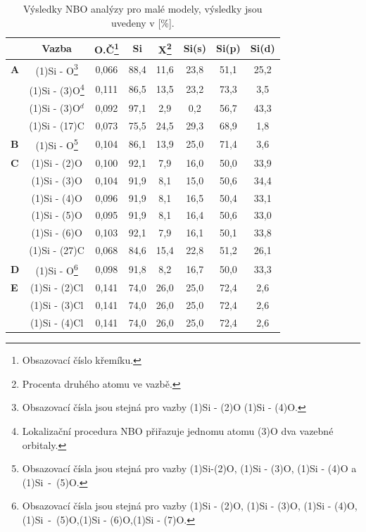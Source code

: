 \documentclass[
digital, %
table,   %
lof,     %
lot,     %
oneside,
]{fithesis3}
\begin{document}
\begin{table}[htbp]
\begin{minipage}{\textwidth}
\caption{Výsledky NBO analýzy pro malé modely, výsledky jsou uvedeny v [\%].}
\begin{center}
\begin{tabular}{|l|c|c|c|c|c|c|c|}
\hline
\label{nbo_small} &  Vazba & O.Č\footnote{Obsazovací číslo křemíku.} & Si & X\footnote{Procenta druhého atomu ve  vazbě.} & Si(s) & Si(p) &Si(d) \\ \hline
\textbf{A} & (1)Si - O\footnote{ Obsazovací čísla jsou stejná pro vazby (1)Si - (2)O (1)Si - (4)O.}  & 0,066 & 88,4  & 11,6  & 23,8  & 51,1  & 25,2  \\ \hline
&  (1)Si - (3)O\footnote{Lokalizační procedura NBO přiřazuje jednomu atomu (3)O dva vazebné orbitaly.} & 0,111 & 86,5  & 13,5  & 23,2  & 73,3  & 3,5  \\ \hline
&  (1)Si - (3)O$^d$ & 0,092 & 97,1  & 2,9  & 0,2  & 56,7  & 43,3  \\ \hline
& (1)Si - (17)C & 0,073 & 75,5  & 24,5  & 29,3  & 68,9  & 1,8  \\ \hline
\textbf{B} & (1)Si - O\footnote{Obsazovací čísla jsou stejná pro vazby (1)Si-(2)O, (1)Si - (3)O, (1)Si - (4)O a (1)Si~-~(5)O.}  & 0,104 & 86,1  & 13,9  & 25,0  & 71,4  & 3,6  \\ \hline
\textbf{C} & (1)Si - (2)O  & 0,100 & 92,1  & 7,9  & 16,0  & 50,0  & 33,9  \\ \hline
& (1)Si - (3)O & 0,104 & 91,9  & 8,1  & 15,0  & 50,6  & 34,4  \\ \hline
&  (1)Si - (4)O& 0,096 & 91,9  & 8,1  & 16,5  & 50,4  & 33,1  \\ \hline
&  (1)Si - (5)O &0,095 & 91,9  & 8,1  & 16,4  & 50,6  & 33,0  \\ \hline
&  (1)Si - (6)O & 0,103 & 92,1  & 7,9  & 16,1  & 50,1  & 33,8  \\ \hline
& (1)Si - (27)C & 0,068 & 84,6  & 15,4  & 22,8  & 51,2  & 26,1  \\ \hline
\textbf{D} & (1)Si - O\footnote{Obsazovací čísla jsou stejná pro vazby (1)Si - (2)O, (1)Si - (3)O, (1)Si - (4)O, (1)Si~-~(5)O,(1)Si - (6)O,(1)Si - (7)O.}  & 0,098 & 91,8  & 8,2  & 16,7  & 50,0  & 33,3  \\ \hline
\textbf{E} & (1)Si - (2)Cl & 0,141 & 74,0  & 26,0  & 25,0  & 72,4  & 2,6  \\ \hline
&  (1)Si - (3)Cl& 0,141 & 74,0  & 26,0  & 25,0  & 72,4  & 2,6  \\ \hline
& (1)Si - (4)Cl & 0,141 & 74,0  & 26,0  & 25,0  & 72,4  & 2,6  \\ \hline

\end{tabular}
\end{center}
\end{minipage}
\end{table}
\end{document}
